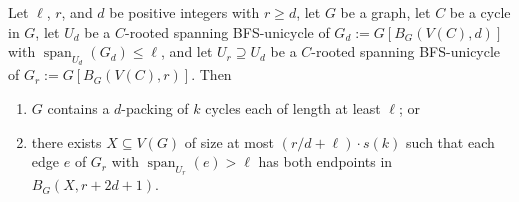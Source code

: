 \documentclass{patmorin}
\DeclareMathOperator{\spn}{span}
\begin{document}
\begin{lem}
  Let $\ell$, $r$, and $d$ be positive integers with $r\ge d$, let $G$ be a graph, let $C$ be a cycle in $G$, let $U_d$ be a $C$-rooted spanning BFS-unicycle of $G_d:=G[B_G(V(C),d)]$ with $\spn_{U_d}(G_d)\le\ell$, and let $U_r\supseteq U_d$ be a $C$-rooted spanning BFS-unicycle of $G_r:=G[B_G(V(C),r)]$. Then
  \begin{enumerate}[nosep,nolistsep,label=\rm(\alph*),ref=(\alph*)]
    \item\label{packing_blowup} $G$ contains a $d$-packing of $k$ cycles each of length at least $\ell$; or

    \item\label{hitting} there exists $X\subseteq V(G)$ of size at most $(r/d+\ell)\cdot s(k)$ such that each edge $e$ of $G_r$ with $\spn_{U_r}(e)>\ell$ has both endpoints in $B_G(X,r+2d+1)$.
  \end{enumerate}
\end{lem}
\end{document}
